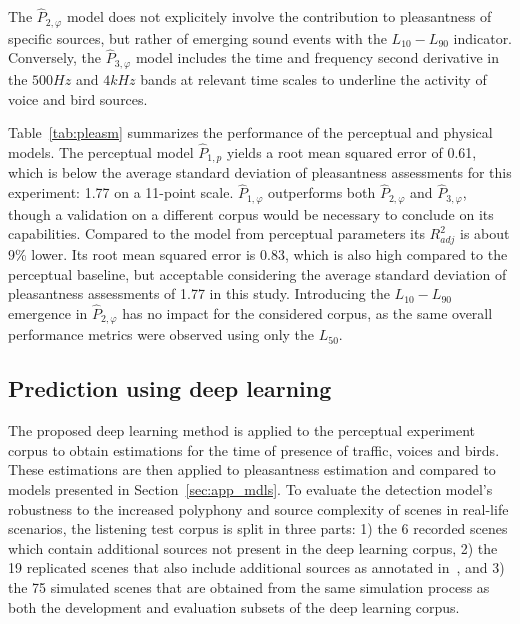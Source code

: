 \documentclass[twocolumn]{article}
\begin{document}
The $\hat P_{2, \varphi}$ model does not explicitely involve the contribution to pleasantness of specific sources, but rather of emerging sound events with the $L_{10}-L_{90}$ indicator. Conversely, the $\hat P_{3, \varphi}$ model includes the time and frequency second derivative in the $500Hz$ and $4kHz$ bands at relevant time scales to underline the activity of voice and bird sources.

Table~\ref{tab:pleasm} summarizes the performance of the perceptual and physical models. The perceptual model $\hat P_{1, p}$ yields a root mean squared error of 0.61, which is below the average standard deviation of pleasantness assessments for this experiment: 1.77 on a 11-point scale. $\hat P_{1, \varphi}$ outperforms both $\hat P_{2, \varphi}$ and $\hat P_{3, \varphi}$, though a validation on a different corpus would be necessary to conclude on its capabilities. Compared to the model from perceptual parameters its $R^2_{adj}$ is about 9\% lower. Its root mean squared error is 0.83, which is also high compared to the perceptual baseline, but acceptable considering the average standard deviation of pleasantness assessments of 1.77 in this study. Introducing the $L_{10}-L_{90}$ emergence in $\hat P_{2, \varphi}$ has no impact for the considered corpus, as the same overall performance metrics were observed using only the $L_{50}$.

\subsection{Prediction using deep learning}
\label{sec:app_deep}




The proposed deep learning method is applied to the perceptual experiment corpus to obtain estimations for the time of presence of traffic, voices and birds. These estimations are then applied to pleasantness estimation and compared to models presented in Section~\ref{sec:app_mdls}. To evaluate the detection model's robustness to the increased polyphony and source complexity of scenes in real-life scenarios, the listening test corpus is split in three parts: 1) the 6 recorded scenes which contain additional sources not present in the deep learning corpus, 2) the 19 replicated scenes that also include additional sources as annotated in~\cite{gloaguen2017}, and 3) the 75 simulated scenes that are obtained from the same simulation process as both the development and evaluation subsets of the deep learning corpus.
\end{document}

